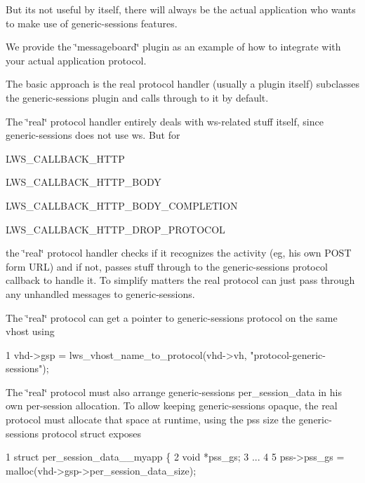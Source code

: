 But it\textquotesingle{}s not useful by itself, there will always be the actual application who wants to make use of generic-\/sessions features.

We provide the \char`\"{}messageboard\char`\"{} plugin as an example of how to integrate with your actual application protocol.

The basic approach is the \textquotesingle{}real\textquotesingle{} protocol handler (usually a plugin itself) subclasses the generic-\/sessions plugin and calls through to it by default.

The \char`\"{}real\char`\"{} protocol handler entirely deals with ws-\/related stuff itself, since generic-\/sessions does not use ws. But for


\begin{DoxyItemize}
\item L\+W\+S\+\_\+\+C\+A\+L\+L\+B\+A\+C\+K\+\_\+\+H\+T\+TP
\item L\+W\+S\+\_\+\+C\+A\+L\+L\+B\+A\+C\+K\+\_\+\+H\+T\+T\+P\+\_\+\+B\+O\+DY
\item L\+W\+S\+\_\+\+C\+A\+L\+L\+B\+A\+C\+K\+\_\+\+H\+T\+T\+P\+\_\+\+B\+O\+D\+Y\+\_\+\+C\+O\+M\+P\+L\+E\+T\+I\+ON
\item L\+W\+S\+\_\+\+C\+A\+L\+L\+B\+A\+C\+K\+\_\+\+H\+T\+T\+P\+\_\+\+D\+R\+O\+P\+\_\+\+P\+R\+O\+T\+O\+C\+OL
\end{DoxyItemize}

the \char`\"{}real\char`\"{} protocol handler checks if it recognizes the activity (eg, his own P\+O\+ST form U\+RL) and if not, passes stuff through to the generic-\/sessions protocol callback to handle it. To simplify matters the real protocol can just pass through any unhandled messages to generic-\/sessions.

The \char`\"{}real\char`\"{} protocol can get a pointer to generic-\/sessions protocol on the same vhost using


\begin{DoxyCode}
1 vhd->gsp = lws\_vhost\_name\_to\_protocol(vhd->vh, "protocol-generic-sessions");
\end{DoxyCode}


The \char`\"{}real\char`\"{} protocol must also arrange generic-\/sessions per\+\_\+session\+\_\+data in his own per-\/session allocation. To allow keeping generic-\/sessions opaque, the real protocol must allocate that space at runtime, using the pss size the generic-\/sessions protocol struct exposes


\begin{DoxyCode}
1 struct per\_session\_data\_\_myapp \{
2         void *pss\_gs;
3 ...
4 
5         pss->pss\_gs = malloc(vhd->gsp->per\_session\_data\_size);
\end{DoxyCode}


